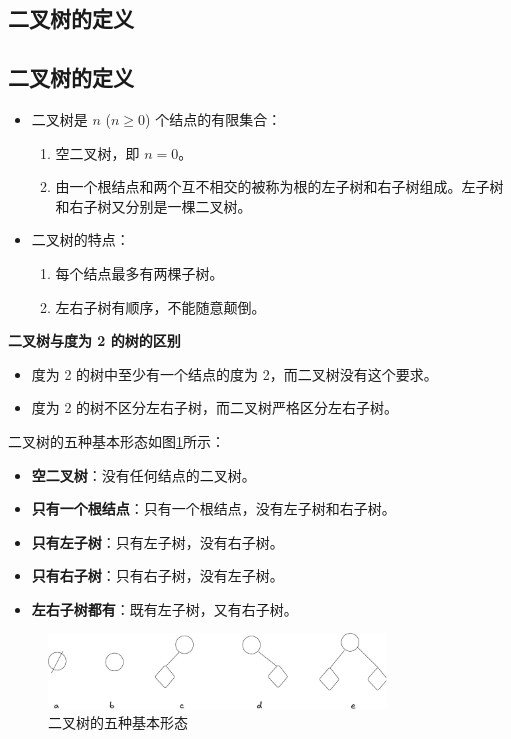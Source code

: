 \documentclass[lang=cn,newtx,10pt,scheme=chinese]{elegantbook}
\begin{document}
\subsection{二叉树的定义}

\subsection{二叉树的定义}

\begin{itemize}
  \item 二叉树是 $n$ ($n \geq 0$) 个结点的有限集合：
  \begin{enumerate}
    \item 空二叉树，即 $n = 0$。
    \item 由一个根结点和两个互不相交的被称为根的左子树和右子树组成。左子树和右子树又分别是一棵二叉树。
  \end{enumerate}
  \item 二叉树的特点：
  \begin{enumerate}
    \item 每个结点最多有两棵子树。
    \item 左右子树有顺序，不能随意颠倒。
  \end{enumerate}
\end{itemize}

\textbf{二叉树与度为 2 的树的区别}

\begin{itemize}
  \item 度为 2 的树中至少有一个结点的度为 2，而二叉树没有这个要求。
  \item 度为 2 的树不区分左右子树，而二叉树严格区分左右子树。
\end{itemize}


二叉树的五种基本形态如图\ref{fig:binary_tree}所示：

\begin{itemize}
  \item \textbf{空二叉树}：没有任何结点的二叉树。
  \item \textbf{只有一个根结点}：只有一个根结点，没有左子树和右子树。
  \item \textbf{只有左子树}：只有左子树，没有右子树。
  \item \textbf{只有右子树}：只有右子树，没有左子树。
  \item \textbf{左右子树都有}：既有左子树，又有右子树。
\end{itemize}



\begin{figure}[h]
  \centering
  \includegraphics[width=0.8\textwidth]{./figure/pdf/cropped/fiveBTree.pdf}
  \caption{二叉树的五种基本形态}
  \label{fig:binary_tree}
\end{figure}
\end{document}
